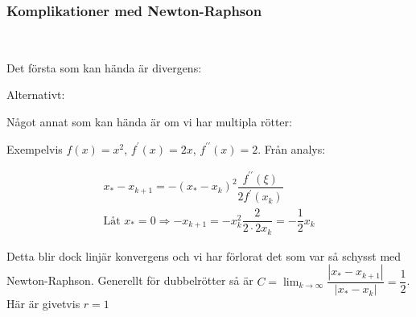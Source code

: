 \subsubsection{Komplikationer med Newton-Raphson}\hfill\\
\par\bigskip
\noindent Det första som kan hända är divergens:

\begin{center}
\end{center}
\par\bigskip
\noindent Alternativt:

\begin{center}
\end{center}
\par\bigskip
\noindent Något annat som kan hända är om vi har multipla rötter:

\begin{center}
\end{center}
\par\bigskip
\noindent Exempelvis $f(x) = x^2$, $f^{\prime}(x) = 2x$, $f^{\prime\prime}(x) = 2$. Från analys:


\begin{equation*}
  \begin{gathered}
    x_*-x_{k+1} = -(x_*-x_k)^2\dfrac{f^{\prime\prime}(\xi)}{2f^{\prime}(x_k)}\\
    \text{Låt } x_* = 0 \Rightarrow -x_{k+1}= -x_k^2\dfrac{2}{2\cdot2x_k}  = -\dfrac{1}{2}x_k
  \end{gathered}
\end{equation*}
\par\bigskip
\noindent Detta blir dock linjär konvergens och vi har förlorat det som var så schysst med Newton-Raphson. Generellt för dubbelrötter så är $C=\lim_{k\to\infty}\dfrac{\left|x_*-x_{k+1}\right|}{\left|x_*-x_k\right|} = \dfrac{1}{2}$. Här är givetvis $r=1$ 














